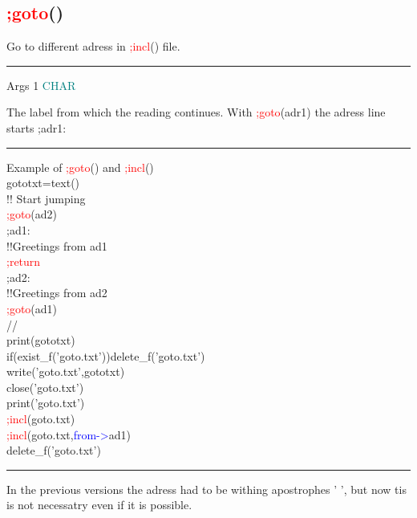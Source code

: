 \subsection{\textcolor{Red}{;goto}()} 
\label{inpugoto} 
Go to different adress in \textcolor{Red}{;incl}() file. 
\vspace{0.3cm} 
\hrule 
\vspace{0.3cm} 
\noindent Args \tabto{3cm} 1 \tabto{5cm}  \textcolor{teal}{CHAR} \tabto{7cm} 
\begin{changemargin}{3cm}{0cm} 
\noindent  The label from which the reading continues. With \textcolor{Red}{;goto}(adr1) 
the adress line starts ;adr1: 
\end {changemargin} 
\hrule 
\vspace{0.2cm} 
\singlespacing 
\begin{example}[inpugotoex]Example of \textcolor{Red}{;goto}() and \textcolor{Red}{;incl}()\\ 
\label{inpugotoex} 
\noindent gototxt=\textcolor{VioletRed}{text}()\\ 
{\color{ForestGreen}!! Start jumping}\\ 
\textcolor{Red}{;goto}(ad2)\\ 
;ad1:\\ 
{\color{ForestGreen}!!Greetings from ad1}\\ 
\textcolor{Red}{;return}\\ 
;ad2:\\ 
{\color{ForestGreen}!!Greetings from ad2}\\ 
\textcolor{Red}{;goto}(ad1)\\ 
//                         \\ 
\textcolor{VioletRed}{print}(gototxt)\\ 
\textcolor{VioletRed}{if}(\textcolor{VioletRed}{exist\_f}('goto.txt'))\textcolor{VioletRed}{delete\_f}('goto.txt')\\ 
\textcolor{VioletRed}{write}('goto.txt',gototxt)\\ 
\textcolor{VioletRed}{close}('goto.txt')\\ 
\textcolor{VioletRed}{print}('goto.txt')\\ 
\textcolor{Red}{;incl}(goto.txt)\\ 
\textcolor{Red}{;incl}(goto.txt,\textcolor{blue}{from->}ad1)\\ 
\textcolor{VioletRed}{delete\_f}('goto.txt')\\ 
\end{example} 
\vspace{-7mm} \rule{5cm}{0.1pt} 
\onehalfspacing 
\begin{note} 
In the previous versions the adress had to be withing apostrophes ' ', but now tis is not necessatry 
even if it is possible. 
\end{note} 
